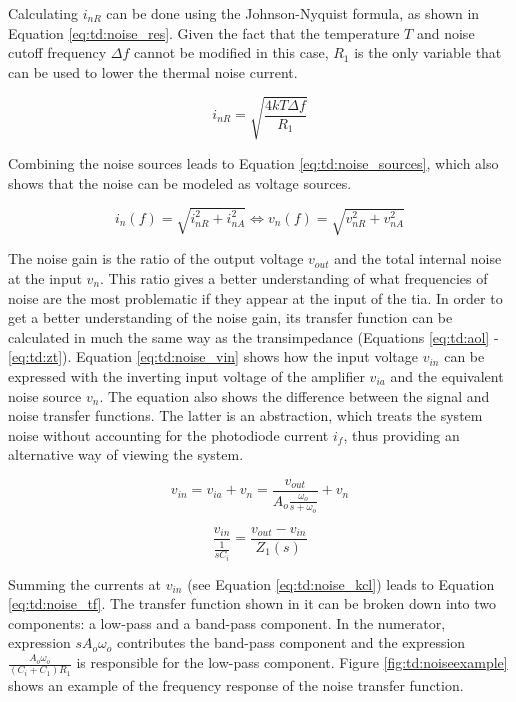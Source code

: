 Calculating $i_{nR}$ can be done using the Johnson-Nyquist formula, as shown in Equation \eqref{eq:td:noise_res}. Given the fact that the temperature $T$ and noise cutoff frequency $\Delta{f}$ cannot be modified in this case, $R_1$ is  the only variable that can be used to lower the thermal noise current.

\begin{equation}\label{eq:td:noise_res}
	i_{nR} = \sqrt{\frac{4kT\Delta{f}}{R_1}}
\end{equation}

Combining the noise sources leads to Equation \eqref{eq:td:noise_sources}, which also shows that the noise can be modeled as voltage sources.  

\begin{equation}\label{eq:td:noise_sources}
	i_n(f) = \sqrt{i_{nR}^2 + i_{nA}^2} \Leftrightarrow
	v_n(f) = \sqrt{v_{nR}^2 + v_{nA}^2}
\end{equation}

The noise gain is the ratio of the output voltage $v_{out}$ and the total internal noise at the input $v_n$. This ratio gives a better understanding of what frequencies of noise are the most problematic if they appear at the input of the \gls{tia}. In order to get a better understanding of the noise gain, its transfer function can be calculated in much the same way as the transimpedance (Equations \ref{eq:td:aol} - \ref{eq:td:zt}). Equation \eqref{eq:td:noise_vin} shows how the input voltage $v_{in}$ can be expressed with the inverting input voltage of the amplifier $v_{ia}$ and the equivalent noise source $v_n$. The equation also shows the difference between the signal and noise transfer functions. The latter is an abstraction, which treats the system noise without accounting for the photodiode current $i_{f}$, thus providing an alternative way of viewing the system.

\begin{equation}\label{eq:td:noise_vin}
	v_{in}  = v_{ia} + v_n = \frac{v_{out}}{A_o\frac{\omega_o}{s + \omega_o}} + v_n
\end{equation}

\begin{equation}\label{eq:td:noise_kcl}
	\frac{v_{in}}{\frac{1}{sC_i}} = \frac{v_{out} - v_{in}}{Z_1(s)}
\end{equation}

Summing the currents at $v_{in}$ (see Equation \eqref{eq:td:noise_kcl}) leads to Equation \eqref{eq:td:noise_tf}. The transfer function shown in it can be broken down into two components: a low-pass and a band-pass component. In the numerator, expression $sA_o\omega_o$ contributes the band-pass component and the expression $\frac{A_o\omega_o}{(C_i + C_1)R_1}$ is responsible for the low-pass component. Figure \ref{fig:td:noiseexample} shows an example of the frequency response of the noise transfer function.

